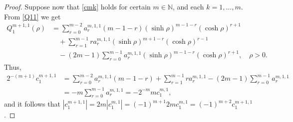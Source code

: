 \documentclass[a4paper,10pt, reqno]{amsart}
\theoremstyle{definition}
\theoremstyle{remark}
\numberwithin{equation}{section}
\begin{document}
{\begin{proof}
Suppose now that \eqref{cmk} holds for certain $m\in \mathbb N$, and each $k=1,\ldots, m$. From \eqref{Q11} we get
\begin{align*}
Q_1^{m+1,1}(\rho )&=\sum_{r=0}^{m-2}a_r^{m,1,1}(m-1-r)(\sinh \rho )^{m-1-r}(\cosh \rho )^{r+1}\\
&\quad +\sum_{r=1}^{m-1}ra_r^{m,1,1}(\sinh \rho )^{m+1-r}(\cosh \rho )^{r-1}\\
&\quad -(2m-1)\sum_{r=0}^{m-1}a_r^{m,1,1}(\sinh \rho )^{m-1-r}(\cosh \rho )^{r+1},\quad \rho >0.
\end{align*}
Thus, 
\begin{align*}
    2^{-(m+1)}c_1^{m+1,1}&=\sum_{r=0}^{m-2}a_r^{m,1,1}(m-1-r)+\sum_{r=1}^{m-1}ra_r^{m,1,1}-(2m-1)\sum_{r=0}^{m-1}a_r^{m,1,1}\\
    &=-m\sum_{r=0}^{m-1}a_r^{m,1,1}=-2^{-m}mc_1^{m,1},
\end{align*}
and it follows that $|c_1^{m+1,1}|=2m|c_1^{m,1}|=(-1)^{m+1}2mc_1^{m,1}=(-1)^{m+2}c_1^{m+1,1}$.


\end{proof}}
\end{document}
